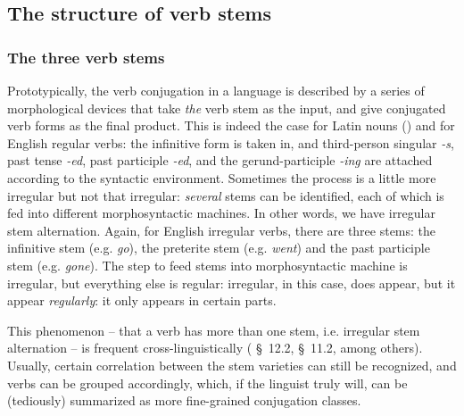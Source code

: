 \documentclass{article}
\newcommand*{\citesec}[1]{\S~{#1}}
\newcommand*{\corpus}[1]{\emph{#1}}
\begin{document}
\subsection{The structure of verb stems}

\subsubsection{The three verb stems}\label{sec:three-latin-stem}

Prototypically, the verb conjugation in a language is described by 
a series of morphological devices that take \emph{the} verb stem as the input,
and give conjugated verb forms as the final product.
This is indeed the case for Latin nouns ()
and for English regular verbs:
the infinitive form is taken in,
and third-person singular \corpus{-s}, past tense \corpus{-ed}, 
past participle \corpus{-ed}, and the gerund-participle \corpus{-ing}
are attached according to the syntactic environment.
Sometimes the process is a little more irregular but not that irregular:
\emph{several} stems can be identified, each of which is fed into different morphosyntactic machines.
In other words, we have irregular stem alternation.
Again, for English irregular verbs,
there are three stems: the infinitive stem (e.g. \corpus{go}), 
the preterite stem (e.g. \corpus{went})
and the past participle stem (e.g. \corpus{gone}).
The step to feed stems into morphosyntactic machine is irregular,
but everything else is regular:
irregular, in this case, does appear, but it appear \emph{regularly}:
it only appears in certain parts.

This phenomenon -- that a verb has more than one stem, i.e. irregular stem alternation
-- is frequent cross-linguistically
(\citealt{jacques2021grammar} \citesec{12.2}, \citealt{forker2020grammar} \citesec{11.2}, among others).
Usually, certain correlation between the stem varieties can still be recognized,
and verbs can be grouped accordingly,
which, if the linguist truly will, can be (tediously) summarized as more fine-grained conjugation classes.
\end{document}
